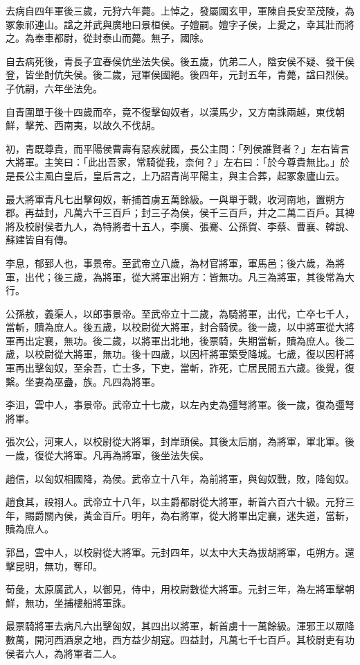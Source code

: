 \begin{pinyinscope}
去病自四年軍後三歲，元狩六年薨。上悼之，發屬國玄甲，軍陳自長安至茂陵，為冢象祁連山。諡之并武與廣地曰景桓侯。子嬗嗣。嬗字子侯，上愛之，幸其壯而將之。為奉車都尉，從封泰山而薨。無子，國除。

自去病死後，青長子宜春侯伉坐法失侯。後五歲，伉弟二人，陰安侯不疑、發干侯登，皆坐酎伉失侯。後二歲，冠軍侯國絕。後四年，元封五年，青薨，諡曰烈侯。子伉嗣，六年坐法免。

自青圍單于後十四歲而卒，竟不復擊匈奴者，以漢馬少，又方南誅兩越，東伐朝鮮，擊羌、西南夷，以故久不伐胡。

初，青既尊貴，而平陽侯曹壽有惡疾就國，長公主問：「列侯誰賢者？」左右皆言大將軍。主笑曰：「此出吾家，常騎從我，柰何？」左右曰：「於今尊貴無比。」於是長公主風白皇后，皇后言之，上乃詔青尚平陽主，與主合葬，起冢象廬山云。

最大將軍青凡七出擊匈奴，斬捕首虜五萬餘級。一與單于戰，收河南地，置朔方郡。再益封，凡萬六千三百戶；封三子為侯，侯千三百戶，并之二萬二百戶。其裨將及校尉侯者九人，為特將者十五人，李廣、張騫、公孫賀、李蔡、曹襄、韓說、蘇建皆自有傳。

李息，郁郅人也，事景帝。至武帝立八歲，為材官將軍，軍馬邑；後六歲，為將軍，出代；後三歲，為將軍，從大將軍出朔方：皆無功。凡三為將軍，其後常為大行。

公孫敖，義渠人，以郎事景帝。至武帝立十二歲，為騎將軍，出代，亡卒七千人，當斬，贖為庶人。後五歲，以校尉從大將軍，封合騎侯。後一歲，以中將軍從大將軍再出定襄，無功。後二歲，以將軍出北地，後票騎，失期當斬，贖為庶人。後二歲，以校尉從大將軍，無功。後十四歲，以因杆將軍築受降城。七歲，復以因杅將軍再出擊匈奴，至余吾，亡士多，下吏，當斬，詐死，亡居民間五六歲。後覺，復繫。坐妻為巫蠱，族。凡四為將軍。

李沮，雲中人，事景帝。武帝立十七歲，以左內史為彊弩將軍。後一歲，復為彊弩將軍。

張次公，河東人，以校尉從大將軍，封岸頭侯。其後太后崩，為將軍，軍北軍。後一歲，復從大將軍。凡再為將軍，後坐法失侯。

趙信，以匈奴相國降，為侯。武帝立十八年，為前將軍，與匈奴戰，敗，降匈奴。

趙食其，祋祤人。武帝立十八年，以主爵都尉從大將軍，斬首六百六十級。元狩三年，賜爵關內侯，黃金百斤。明年，為右將軍，從大將軍出定襄，迷失道，當斬，贖為庶人。

郭昌，雲中人，以校尉從大將軍。元封四年，以太中大夫為拔胡將軍，屯朔方。還擊昆明，無功，奪印。

荀彘，太原廣武人，以御見，侍中，用校尉數從大將軍。元封三年，為左將軍擊朝鮮，無功，坐捕樓船將軍誅。

最票騎將軍去病凡六出擊匈奴，其四出以將軍，斬首虜十一萬餘級。渾邪王以眾降數萬，開河西酒泉之地，西方益少胡寇。四益封，凡萬七千七百戶。其校尉吏有功侯者六人，為將軍者二人。


\end{pinyinscope}
